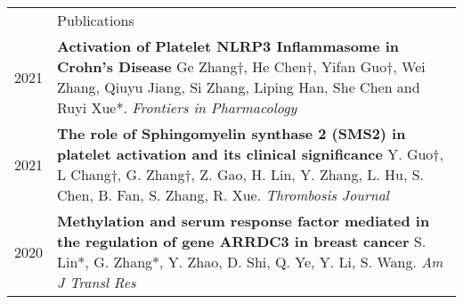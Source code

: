 \documentclass[letterpaper, 11pt]{article}
\newcommand{\headingfont}{\Large\color{OliveGreen}}
\newenvironment{SectionTable}[1]{
	\renewcommand*{\arraystretch}{1.7}
	\setlength{\tabcolsep}{10pt}
	\begin{longtable}{Rp{5.2in}} & #1 \\}
{\end{longtable}\vspace{-.3cm}}
\begin{document}

\begin{SectionTable}{\headingfont Publications} 
2021 & 
\textbf{Activation of Platelet NLRP3 Inflammasome in Crohn’s Disease} \newline
Ge Zhang†, He Chen†, Yifan Guo†, Wei Zhang, Qiuyu Jiang, Si Zhang, Liping Han, She Chen and Ruyi Xue*. \newline
\textit{Frontiers in Pharmacology} \\

2021 & 
\textbf{The role of Sphingomyelin synthase 2 (SMS2) in platelet activation and its clinical significance} \newline
Y. Guo†, L Chang†, G. Zhang†, Z. Gao, H. Lin, Y. Zhang, L. Hu, S. Chen, B. Fan, S. Zhang, R. Xue. \newline
\textit{Thrombosis Journal} \\

2020 & 
\textbf{Methylation and serum response factor mediated in the regulation of gene ARRDC3 in breast cancer} \newline
S. Lin*, G. Zhang*, Y. Zhao, D. Shi, Q. Ye, Y. Li, S. Wang. \newline
\textit{Am J Transl Res}

\end{SectionTable}

\end{document}
